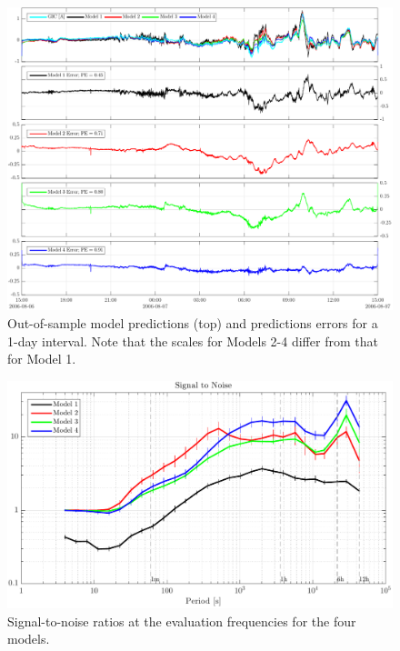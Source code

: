 \documentclass[draft,linenumbers]{agujournal2018}
\begin{document}
\begin{figure}[h]
\centering
\includegraphics[width=\textwidth]{figures/plot_model_predictions-MeanModel-20060806T150000.pdf}
\caption{Out-of-sample model predictions (top) and predictions errors for a 1-day interval. Note that the scales for Models 2-4 differ from that for Model 1.}
\label{predictions}
\end{figure}

\begin{figure}[h]
\centering
\includegraphics[width=\textwidth]{figures/plot_TF_aves_SN-options-1.pdf}
\caption{Signal-to-noise ratios at the evaluation frequencies for the four models.}
\label{SN}
\end{figure}
\end{document}
